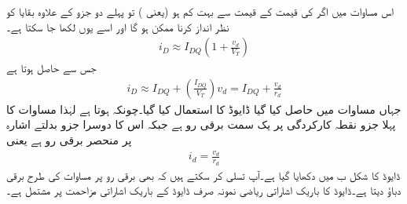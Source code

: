 اس مساوات میں اگر   کی قیمت  کے قیمت سے بہت کم ہو (یعنی ) تو پہلے دو جزو کے علاوہ بقایا کو نظر انداز کرنا ممکن ہو گا اور اسے یوں لکھا جا سکتا ہے۔
\begin{align}
i_D \approx I_{DQ} \left (1+\frac{v_d}{V_T} \right )
\end{align}
جس سے حاصل ہوتا ہے
\begin{align} \label{مساوات_ڈایوڈ_یکسمتی_اور_بدلتا_رو}
i_D \approx I_{DQ} +\left( \frac{I_{DQ}}{V_T} \right ) v_d = I_{DQ}+\frac{v_d}{r_d}
\end{align}
جہاں مساوات  میں حاصل کیا گیا ڈایوڈ کا   استعمال کیا گیا۔چونکہ  ہوتا ہے لہٰذا مساوات   کا پہلا جزو نقطہ کارکردگی پر یک سمت برقی رو  ہے جبکہ اس کا دوسرا جزو بدلتے اشارہ   پر منحصر برقی رو  ہے یعنی
\begin{align} \label{مساوات_ڈایوڈ_باریک_ماڈل_کا_حصول}
i_d = \frac{v_d}{r_d}
\end{align}
ڈایوڈ کا   شکل  ب میں دکھایا گیا ہے۔آپ تسلی کر سکتے ہیں کہ  بھی برقی رو  پر  مساوات  کی طرح برقی دباؤ   دیتا ہے۔ڈایوڈ کا باریک اشاراتی ریاضی نمونہ صرف ڈایوڈ کے باریک اشاراتی مزاحمت  پر مشتمل ہے۔


